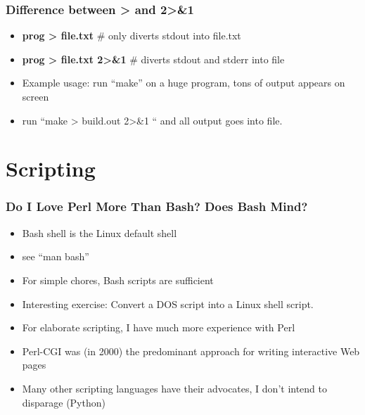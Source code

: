 \documentclass[English]{beamer}
\begin{document}
\begin{frame}
\frametitle{Difference between > and 2>\&1 }
\begin{itemize}
\item\textbf{ prog > file.txt } \# only diverts stdout into file.txt
  \item\textbf{ prog > file.txt 2>\&1} \# diverts stdout and stderr
    into file 
  \item Example usage: run ``make'' on a huge program, tons of output
    appears on screen
  \item run ``make > build.out 2>\&1 `` and all output goes into file.
  \end{itemize}

\end{frame}




\section{Scripting}

\begin{frame}
  \frametitle{Do I Love Perl More Than Bash? Does Bash Mind?}
  \begin{itemize}
  \item Bash shell is the Linux default shell
  \item see ``man bash''
  \item For simple chores, Bash scripts are sufficient
  \item Interesting exercise: Convert a DOS script into a Linux shell script.
  \item For elaborate scripting, I have much more experience with
    Perl
  \item Perl-CGI was (in 2000) the predominant approach for writing
    interactive Web pages
  \item Many other scripting languages have their advocates, I don't
    intend to disparage (Python)
  \end{itemize}
\end{frame}
\end{document}
